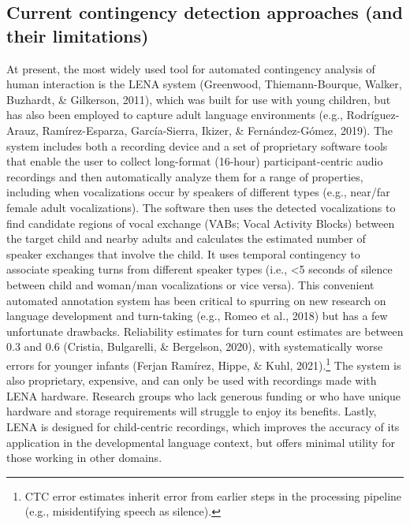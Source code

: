 \documentclass[10pt, letterpaper]{article}
\begin{document}
\hypertarget{current-contingency-detection-approaches-and-their-limitations}{%
\subsection{Current contingency detection approaches (and their
limitations)}\label{current-contingency-detection-approaches-and-their-limitations}}

At present, the most widely used tool for automated contingency analysis
of human interaction is the LENA system (Greenwood, Thiemann-Bourque,
Walker, Buzhardt, \& Gilkerson, 2011), which was built for use with
young children, but has also been employed to capture adult language
environments (e.g., Rodríguez-Arauz, Ramírez-Esparza, García-Sierra,
Ikizer, \& Fernández-Gómez, 2019). The system includes both a recording
device and a set of proprietary software tools that enable the user to
collect long-format (16-hour) participant-centric audio recordings and
then automatically analyze them for a range of properties, including
when vocalizations occur by speakers of different types (e.g., near/far
female adult vocalizations). The software then uses the detected
vocalizations to find candidate regions of vocal exchange (VABs; Vocal
Activity Blocks) between the target child and nearby adults and
calculates the estimated number of speaker exchanges that involve the
child. It uses temporal contingency to associate speaking turns from
different speaker types (i.e., \textless5 seconds of silence between
child and woman/man vocalizations or vice versa). This convenient
automated annotation system has been critical to spurring on new
research on language development and turn-taking (e.g., Romeo et al.,
2018) but has a few unfortunate drawbacks. Reliability estimates for
turn count estimates are between 0.3 and 0.6 (Cristia, Bulgarelli, \&
Bergelson, 2020), with systematically worse errors for younger infants
(Ferjan Ramírez, Hippe, \& Kuhl, 2021).\footnote{CTC error estimates
  inherit error from earlier steps in the processing pipeline (e.g.,
  misidentifying speech as silence).} The system is also proprietary,
expensive, and can only be used with recordings made with LENA hardware.
Research groups who lack generous funding or who have unique hardware
and storage requirements will struggle to enjoy its benefits. Lastly,
LENA is designed for child-centric recordings, which improves the
accuracy of its application in the developmental language context, but
offers minimal utility for those working in other domains.
\end{document}
